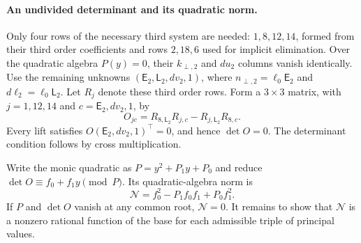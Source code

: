 \documentclass[11pt,a4paper]{article}
\numberwithin{equation}{section}
\theoremstyle{plain}
\theoremstyle{definition}
\theoremstyle{remark}
\begin{document}
\paragraph{An undivided determinant and its quadratic norm.}
Only four rows of the necessary third system are needed: $1,8,12,14$,
formed from their third order coefficients and rows $2,18,6$ used for implicit elimination.
Over the quadratic algebra $P(y)=0$, their $k_{\perp,2}$ and $du_2$ columns
vanish identically.  Use the remaining unknowns
$(\mathsf E_2,\mathsf L_2,dv_2,1)$, where
$n_{\perp,2}=\ell_0\mathsf E_2$ and
$d\ell_2=\ell_0\mathsf L_2$.
Let $R_j$ denote these third order rows.  Form a $3\times3$ matrix, with
$j=1,12,14$ and $c=\mathsf E_2,dv_2,1$, by
\begin{equation}\label{appr3tau:determinant}
 O_{jc}=R_{8,\mathsf L_2}R_{j,c}
             -R_{j,\mathsf L_2}R_{8,c}.
\end{equation}
Every lift satisfies $O(\mathsf E_2,dv_2,1)^{\top}=0$, and hence $\det O=0$.
The determinant condition follows by cross multiplication.

Write the monic quadratic as $P=y^2+P_1y+P_0$ and reduce
$\det O\equiv f_0+f_1y\pmod P$.  Its quadratic-algebra norm is
\begin{equation}\label{appr3tau:norm}
 \mathcal N=f_0^2-P_1f_0f_1+P_0f_1^2.
\end{equation}
If $P$ and $\det O$ vanish at any common root, $\mathcal N=0$.
It remains to show that $\mathcal N$ is a nonzero
rational function of the base for each admissible triple of principal values.
\end{document}
